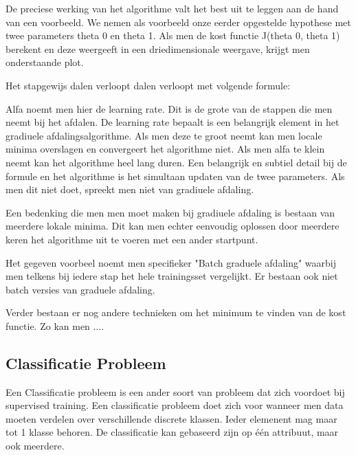 De preciese werking van het algorithme valt het best uit te leggen aan de hand van een voorbeeld. We nemen als voorbeeld onze eerder opgestelde hypothese met twee parameters theta 0 en theta 1. Als men de kost functie J(theta 0, theta 1) berekent en deze weergeeft in een driedimensionale weergave, krijgt men onderstaande plot.


Het stapgewijs dalen verloopt dalen verloopt met volgende formule:


Alfa noemt men hier de learning rate. Dit is de grote van de stappen die men neemt bij het afdalen. De learning rate bepaalt is een belangrijk element in het gradiuele afdalingsalgorithme. Als men deze te groot neemt kan men locale minima overslagen en convergeert het algorithme niet. Als men alfa te klein neemt kan het algorithme heel lang duren.
Een belangrijk en subtiel detail bij de formule en het algorithme is het simultaan updaten van de twee parameters. Als men dit niet doet, spreekt men niet van gradiuele afdaling.

Een bedenking die men men moet maken bij gradiuele afdaling is bestaan van meerdere lokale minima. Dit kan men echter eenvoudig oplossen door meerdere keren het algorithme uit te voeren met een ander startpunt.

Het gegeven voorbeel noemt men specifieker "Batch graduele afdaling" waarbij men  telkens bij iedere stap het hele trainingsset vergelijkt. Er bestaan ook niet batch versies van graduele afdaling.

Verder bestaan er nog andere technieken om het minimum te vinden van de kost functie. Zo kan men ....



\subsection{Classificatie Probleem}\label{Classificatie Probleem}

Een Classificatie probleem is een ander soort van probleem dat zich voordoet bij supervised training. Een classificatie probleem doet zich voor wanneer men data moeten verdelen over verschillende discrete klassen. Ieder elemenent mag maar tot 1 klasse behoren. De classificatie kan gebaseerd zijn op één attribuut, maar ook meerdere.

